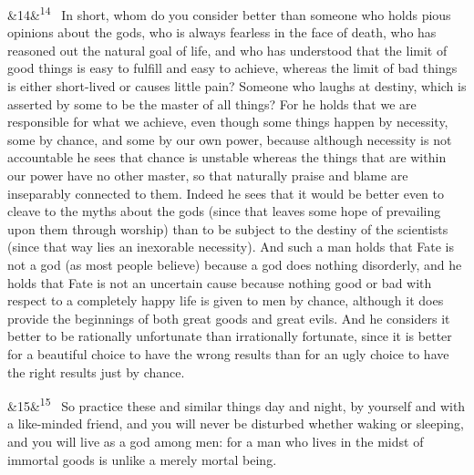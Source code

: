 \documentclass[12pt]{article}
\newcommand{\para}[1][]{\par\noindent\ifx&#1&\else\textsuperscript{\footnotesize #1}~\fi}
\begin{document}
\para[14] In short, whom do you consider better than someone who holds pious opinions about the gods, who is always fearless in the face of death, who has reasoned out the natural goal of life, and who has understood that the limit of good things is easy to fulfill and easy to achieve, whereas the limit of bad things is either short-lived or causes little pain? Someone who laughs at destiny, which is asserted by some to be the master of all things? For he holds that we are responsible for what we achieve, even though some things happen by necessity, some by chance, and some by our own power, because although necessity is not accountable he sees that chance is unstable whereas the things that are within our power have no other master, so that naturally praise and blame are inseparably connected to them. Indeed he sees that it would be better even to cleave to the myths about the gods (since that leaves some hope of prevailing upon them through worship) than to be subject to the destiny of the scientists (since that way lies an inexorable necessity). And such a man holds that Fate is not a god (as most people believe) because a god does nothing disorderly, and he holds that Fate is not an uncertain cause because nothing good or bad with respect to a completely happy life is given to men by chance, although it does provide the beginnings of both great goods and great evils. And he considers it better to be rationally unfortunate than irrationally fortunate, since it is better for a beautiful choice to have the wrong results than for an ugly choice to have the right results just by chance.

\para[15] So practice these and similar things day and night, by yourself and with a like-minded friend, and you will never be disturbed whether waking or sleeping, and you will live as a god among men: for a man who lives in the midst of immortal goods is unlike a merely mortal being.
\end{document}
